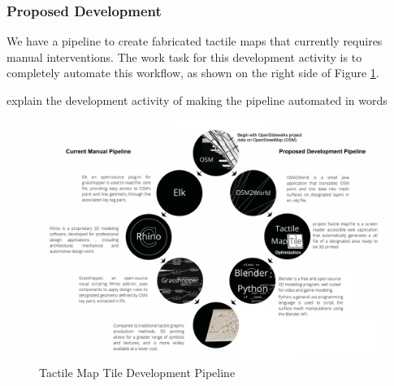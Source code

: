 \subsubsection{Proposed Development}

We have a pipeline to create fabricated tactile maps that currently requires manual interventions. The work task for this development activity is to completely automate this workflow, as shown on the right side of Figure \ref{fig:TactileMapTileDev}.

\ac{explain the development activity of making the pipeline automated in words}

\begin{figure}
    \centering
    \includegraphics[width=5.5in]{pics/TactileMaptilePipeline.jpg}
    \caption{Tactile Map Tile Development Pipeline}
    \label{fig:TactileMapTileDev}
\end{figure}


